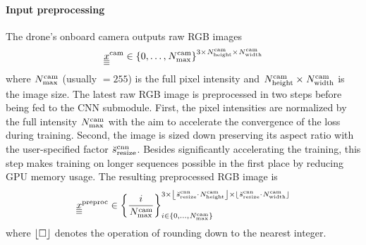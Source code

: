 \paragraph*{Input preprocessing} ${}$\\
The drone's onboard camera 
outputs raw RGB images
\begin{equation}
    {}_{}^{} {\underline{\underline{\underline x}}}^{\text{cam}}_{} \in \left\{ 0, \dots, {}_{}^{} {N}^{\text{cam}}_{\text{max}} \right\}^{
        3 \times {}_{}^{} {N}^{\text{cam}}_{\text{height}} \times {}_{}^{} {N}^{\text{cam}}_{\text{width}}}
\end{equation}
where 
${}_{}^{} {N}^{\text{cam}}_{\text{max}}$ (usually $= 255$) is the full pixel intensity 
and
${}_{}^{} {N}^{\text{cam}}_{\text{height}} \times {}_{}^{} {N}^{\text{cam}}_{\text{width}}$
is the image size.
The latest raw RGB image is preprocessed in two steps
before being fed to the CNN submodule.
First, the pixel intensities are normalized by the full intensity 
${}_{}^{} {N}^{\text{cam}}_{\text{max}}$ with the aim
to accelerate the convergence of the loss during training.
Second, the image is sized down 
preserving its aspect ratio
with the user-specified factor ${}_{}^{} \breve{s}^{\text{cnn}}_{\text{resize}}$.
Besides significantly accelerating the training,
this step makes training on longer sequences possible
in the first place by reducing GPU memory usage.
The resulting preprocessed RGB image is
\begin{equation} \label{eq:rgb_preproc}
    {}_{}^{} {\underline{\underline{\underline x}}}^{\text{preproc}}_{} \in \left\{ \frac{i}{{}_{}^{} {N}^{\text{cam}}_{\text{max}}} \right\}_{
        i \in \left\{ 0, \dots, {}_{}^{} {N}^{\text{cam}}_{\text{max}} \right\}
    }^{
        3 \times 
        \left\lfloor {}_{}^{} \breve{s}^{\text{cnn}}_{\text{resize}} \cdot {}_{}^{} {N}^{\text{cam}}_{\text{height}} \right\rfloor \times 
        \left\lfloor {}_{}^{} \breve{s}^{\text{cnn}}_{\text{resize}} \cdot {}_{}^{} {N}^{\text{cam}}_{\text{width}} \right\rfloor
    }
\end{equation} 
where $\left\lfloor \square \right\rfloor$ denotes the operation of rounding down to the nearest integer.



